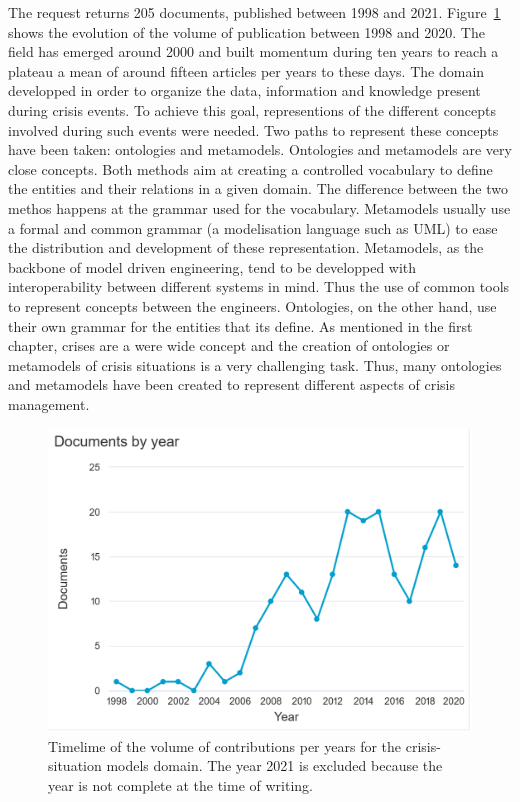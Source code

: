 The request returns 205 documents, published between 1998 and 2021.
Figure~\ref{literature:situation-models-hist} shows the evolution of the volume of publication between 1998 and 2020.
The field has emerged around 2000 and built momentum during ten years to reach a plateau a mean of around fifteen articles per years to these days.
The domain developped in order to organize the data, information and knowledge present during crisis events.
To achieve this goal, representions of the different concepts involved during such events were needed.
Two paths to represent these concepts have been taken: ontologies and metamodels.
Ontologies and metamodels are very close concepts.
Both methods aim at creating a controlled vocabulary to define the entities and their relations in a given domain.
The difference between the two methos happens at the grammar used for the vocabulary.
Metamodels usually use a formal and common grammar (a modelisation language such as UML) to ease the distribution and development of these representation.
Metamodels, as the backbone of model driven engineering, tend to be developped with interoperability between different systems in mind.
Thus the use of common tools to represent concepts between the engineers.
Ontologies, on the other hand, use their own grammar for the entities that its define.
As mentioned in the first chapter, crises are a were wide concept and the creation of ontologies or metamodels of crisis situations is a very challenging task.
Thus, many ontologies and metamodels have been created to represent different aspects of crisis management.

\begin{figure}[bp]
    \centering
    \includegraphics[width=\textwidth]{figures/chap-2/situation-models-hist.pdf}
    \caption{Timelime of the volume of contributions per years for the crisis-situation models domain. The year 2021 is excluded because the year is not complete at the time of writing.}
    \label{literature:situation-models-hist}
\end{figure}

